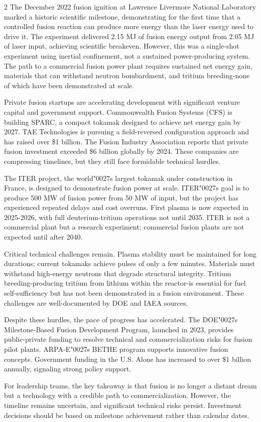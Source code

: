 \documentclass[10pt,a4paper]{article}
\newcommand{\BOApos}{{\BOQuoteFont\char"0027}}
\begin{document}
\begin{multicols}{2}
{\small The December 2022 fusion ignition at Lawrence Livermore National Laboratory marked a historic scientific milestone, demonstrating for the first time that a controlled fusion reaction can produce more energy than the laser energy used to drive it. The experiment delivered 2.15 MJ of fusion energy output from 2.05 MJ of laser input, achieving scientific breakeven. However, this was a single-shot experiment using inertial confinement, not a sustained power-producing system. The path to a commercial fusion power plant requires sustained net energy gain, materials that can withstand neutron bombardment, and tritium breeding-none of which have been demonstrated at scale.}\par
{\small Private fusion startups are accelerating development with significant venture capital and government support. Commonwealth Fusion Systems (CFS) is building SPARC, a compact tokamak designed to achieve net energy gain by 2027. TAE Technologies is pursuing a field-reversed configuration approach and has raised over \$1 billion. The Fusion Industry Association reports that private fusion investment exceeded \$6 billion globally by 2024. These companies are compressing timelines, but they still face formidable technical hurdles.}\par
{\small The ITER project, the world\BOApos{}s largest tokamak under construction in France, is designed to demonstrate fusion power at scale. ITER\BOApos{}s goal is to produce 500 MW of fusion power from 50 MW of input, but the project has experienced repeated delays and cost overruns. First plasma is now expected in 2025-2026, with full deuterium-tritium operations not until 2035. ITER is not a commercial plant but a research experiment; commercial fusion plants are not expected until after 2040.}\par
{\small Critical technical challenges remain. Plasma stability must be maintained for long durations; current tokamaks achieve pulses of only a few minutes. Materials must withstand high-energy neutrons that degrade structural integrity. Tritium breeding-producing tritium from lithium within the reactor-is essential for fuel self-sufficiency but has not been demonstrated in a fusion environment. These challenges are well-documented by DOE and IAEA sources.}\par
{\small Despite these hurdles, the pace of progress has accelerated. The DOE\BOApos{}s Milestone-Based Fusion Development Program, launched in 2023, provides public-private funding to resolve technical and commercialization risks for fusion pilot plants. ARPA-E\BOApos{}s BETHE program supports innovative fusion concepts. Government funding in the U.S. Alone has increased to over \$1 billion annually, signaling strong policy support.}\par
{\small For leadership teams, the key takeaway is that fusion is no longer a distant dream but a technology with a credible path to commercialization. However, the timeline remains uncertain, and significant technical risks persist. Investment decisions should be based on milestone achievement rather than calendar dates.}\par
\end{multicols}
\label{chap:1:end}
\end{document}
